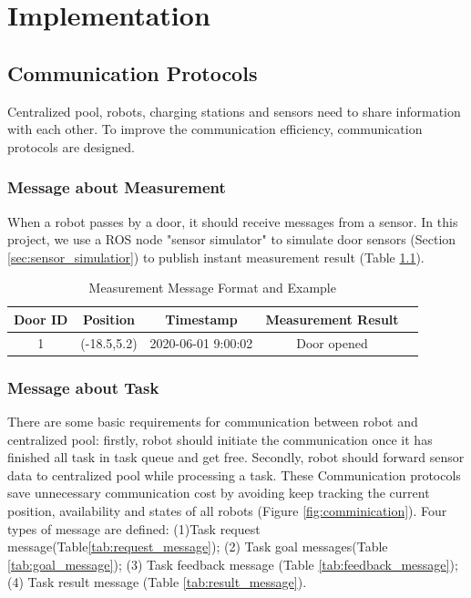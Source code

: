 \chapter{Implementation}


\section{Communication Protocols}


Centralized pool, robots, charging stations and sensors need to share information with each other.
To improve the communication efficiency, communication protocols are designed. 

\subsection{Message about Measurement}
\label{sec:measurement_message}
When a robot passes by a door, it should receive messages from a sensor. In this project, we use a ROS node "sensor simulator" to simulate door sensors (Section \ref{sec:sensor_simulatior}) to publish instant measurement result (Table \ref{tab:sensor_message}).

\begin{table}[htb]
\centering
\begin{tabular}{|c|c|c|c|c|} 
\hline
Door ID  & Position& Timestamp & Measurement Result \\
\hline\hline
1&(-18.5,5.2) & 2020-06-01 9:00:02 & Door opened \\ [1ex] 
\hline
\end{tabular}
\caption{Measurement Message Format and Example}
\label{tab:sensor_message}
\end{table}
	

\subsection{Message about Task}
\label{sec:task_message}
There are some basic requirements for communication between robot and centralized pool: firstly,
robot should initiate the communication once it has finished all task in task queue and get free. 
Secondly, robot should forward sensor data to centralized pool while processing a task. 
These Communication protocols save unnecessary communication cost by avoiding keep tracking the current position, availability and states of all robots (Figure \ref{fig:comminication}).
Four types of message are defined: 
(1)Task request message(Table\ref{tab:request_message}); (2) Task goal messages(Table \ref{tab:goal_message}); (3) Task feedback message (Table \ref{tab:feedback_message}); (4) Task result message (Table \ref{tab:result_message}). 

